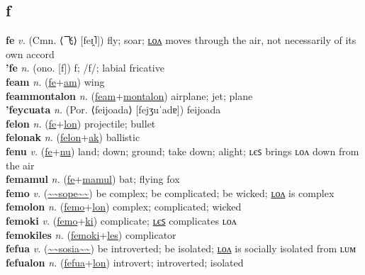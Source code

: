 \subsection{f}

\textbf{fe} \textit{v.} (Cmn. ⟨飞⟩ [feɪ̯˥])
fly; soar; \hyperref[felon]{ʟᴏᴧ} moves through the air, not necessarily of its own accord \label{fe} \\
\textbf{'fe} \textit{n.} (ono. [f])
f; /f/; labial fricative \label{'fe} \\
\textbf{feam} \textit{n.} (\hyperref[fe]{fe}+\hyperref[am]{am})
wing \label{feam} \\
\textbf{feammontalon} \textit{n.} (\hyperref[feam]{feam}+\hyperref[montalon]{montalon})
airplane; jet; plane \label{feammontalon} \\
\textbf{'feycuata} \textit{n.} (Por. ⟨feijoada⟩ [fejʒuˈadɐ])
feijoada \label{'feycuata} \\
\textbf{felon} \textit{n.} (\hyperref[fe]{fe}+\hyperref[lon]{lon})
projectile; bullet \label{felon} \\
\textbf{felonak} \textit{n.} (\hyperref[felon]{felon}+\hyperref[ak]{ak})
ballistic \label{felonak} \\
\textbf{fenu} \textit{v.} (\hyperref[fe]{fe}+\hyperref[nu]{nu})
land; down; ground; take down; alight; ʟєꜱ brings ʟᴏᴧ down from the air \label{fenu} \\
\textbf{femamul} \textit{n.} (\hyperref[fe]{fe}+\hyperref[mamul]{mamul})
bat; flying fox \label{femamul} \\
\textbf{femo} \textit{v.} (\hyperref[sope]{\~{}\~{}sope\~{}\~{}})
be complex; be complicated; be wicked; \hyperref[femolon]{ʟᴏᴧ} is complex \label{femo} \\
\textbf{femolon} \textit{n.} (\hyperref[femo]{femo}+\hyperref[lon]{lon})
complex; complicated; wicked \label{femolon} \\
\textbf{femoki} \textit{v.} (\hyperref[femo]{femo}+\hyperref[ki]{ki})
complicate; \hyperref[femokiles]{ʟєꜱ} complicates ʟᴏᴧ \label{femoki} \\
\textbf{femokiles} \textit{n.} (\hyperref[femoki]{femoki}+\hyperref[les]{les})
complicator \label{femokiles} \\
\textbf{fefua} \textit{v.} (\hyperref[sosia]{\~{}\~{}sosia\~{}\~{}})
be introverted; be isolated; \hyperref[fefualon]{ʟᴏᴧ} is socially isolated from ʟᴜᴍ \label{fefua} \\
\textbf{fefualon} \textit{n.} (\hyperref[fefua]{fefua}+\hyperref[lon]{lon})
introvert; introverted; isolated \label{fefualon} \\
